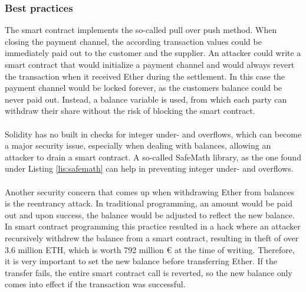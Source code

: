 \subsubsection{Best practices}
The smart contract implements the so-called pull over push method\cite{best-practice}.
When closing the payment channel, the according transaction values could be immediately paid out to the customer and the supplier.
An attacker could write a smart contract that would initialize a payment channel and would always revert the transaction when it received Ether during the settlement.
In this case the payment channel would be locked forever, as the customers balance could be never paid out.
Instead, a balance variable is used, from which each party can withdraw their share without the risk of blocking the smart contract.
\\\\
Solidity has no built in checks for integer under- and overflows, which can become a major security issue, especially when dealing with balances, allowing an attacker to drain a smart contract.
A so-called SafeMath library, as the one found under Listing \ref{lis:safemath} can help in preventing integer under- and overflows.
\\\\
Another security concern that comes up when withdrawing Ether from balances is the reentrancy attack.
In traditional programming, an amount would be paid out and upon success, the balance would be adjusted to reflect the new balance.
In smart contract programming this practice resulted in a hack where an attacker recursively withdrew the balance from a smart contract, resulting in theft of over 3.6 million ETH, which is worth 792 million \euro{} at the time of writing\cite{dao-hack}.
Therefore, it is very important to set the new balance before transferring Ether.
If the transfer fails, the entire smart contract call is reverted, so the new balance only comes into effect if the transaction was successful.